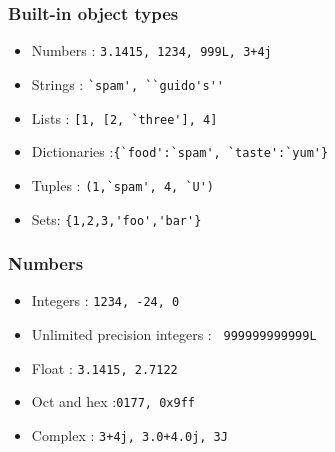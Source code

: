 
\begin{frame}[fragile]\frametitle{Built-in object types}
  \begin{itemize}
  \item Numbers : \lstinline{3.1415, 1234, 999L, 3+4j}
  \item Strings : \lstinline{`spam', ``guido's''}
  \item Lists : \lstinline{[1, [2, `three'], 4]}
   \item Dictionaries :\lstinline|{`food':`spam', `taste':`yum'}|
  \item Tuples : \lstinline{(1,`spam', 4, `U')}
  \item Sets: \lstinline|{1,2,3,'foo','bar'}|
  \end{itemize}
\end{frame}

\begin{frame}[fragile]\frametitle{Numbers}
  \begin{itemize}
  \item Integers : \lstinline{1234, -24, 0}
  \item Unlimited precision integers : \lstinline{ 999999999999L}
  \item Float : \lstinline{3.1415, 2.7122}
   \item Oct and hex :\lstinline|0177, 0x9ff|
  \item Complex : \lstinline{3+4j, 3.0+4.0j, 3J}
  \end{itemize}
\end{frame}


